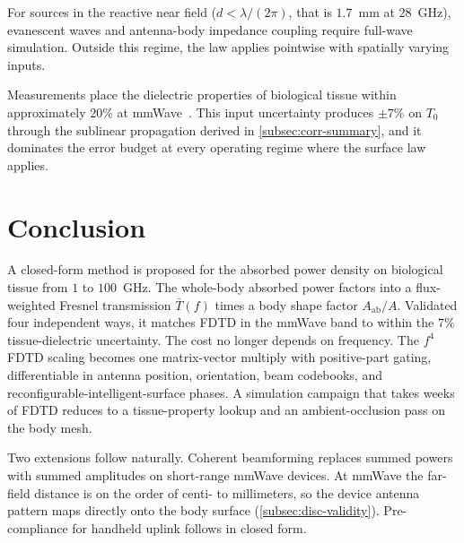 \documentclass[journal,twocolumn,10pt]{IEEEtran}
\theoremstyle{plain}
\newcommand{\Aab}{A_{\mathrm{ab}}}
\newcommand{\Tbar}{\bar{T}}
\begin{document}
For sources in the reactive near field ($d < \lambda/(2\pi)$, that is
$1.7$~mm at $28$~GHz), evanescent waves and antenna-body impedance
coupling require full-wave simulation. Outside this regime, the law
applies pointwise with spatially varying inputs.

Measurements place the dielectric properties of biological tissue
within approximately $20\%$ at mmWave~\cite{AlekseevZiskin2007}. This
input uncertainty produces $\pm 7\%$ on $T_0$ through the sublinear
propagation derived in \cref{subsec:corr-summary}, and it dominates
the error budget at every operating regime where the surface law
applies.

\section{Conclusion}\label{sec:conc}

A closed-form method is proposed for the absorbed power density on
biological tissue from $1$ to $100$~GHz. The whole-body absorbed
power factors into a flux-weighted Fresnel transmission $\Tbar(f)$
times a body shape factor $\Aab/A$. Validated four independent ways, it matches FDTD in the mmWave band
to within the $7\%$ tissue-dielectric uncertainty. The cost no longer
depends on frequency. The $f^4$ FDTD scaling becomes one matrix-vector multiply
with positive-part gating, differentiable in antenna position,
orientation, beam codebooks, and reconfigurable-intelligent-surface
phases. A simulation campaign that takes
weeks of FDTD reduces to a tissue-property lookup and an
ambient-occlusion pass on the body mesh.

Two extensions follow naturally. Coherent beamforming replaces
summed powers with summed amplitudes on short-range mmWave devices.
At mmWave the far-field distance is on the order of centi- to
millimeters, so the device antenna pattern maps directly onto the body
surface
(\cref{subsec:disc-validity}). Pre-compliance for handheld uplink
follows in closed form.
\end{document}
